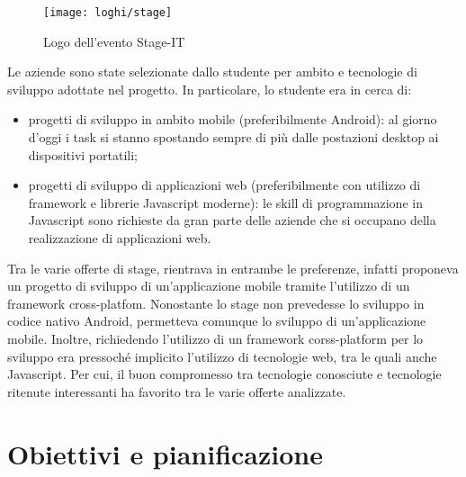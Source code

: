 \begin{figure}[!h] 
    \centering 
    \texttt{[image: loghi/stage]} 
    \caption{Logo dell'evento Stage-IT}
\end{figure}

Le aziende sono state selezionate dallo studente per ambito e tecnologie di sviluppo adottate nel progetto. In particolare, lo studente era in cerca di:
\begin{itemize}
	\item progetti di sviluppo in ambito mobile (preferibilmente Android): al giorno d'oggi i task si stanno spostando sempre di più dalle postazioni desktop ai dispositivi portatili;
	\item progetti di sviluppo di applicazioni web (preferibilmente con utilizzo di framework e librerie Javascript moderne): le skill di programmazione in Javascript sono richieste da gran parte delle aziende che si occupano della realizzazione di applicazioni web.
\end{itemize}
Tra le varie offerte di stage, \visione{} rientrava in entrambe le preferenze, infatti proponeva un progetto di sviluppo di un'applicazione mobile tramite l'utilizzo di un framework cross-platfom. Nonostante lo stage non prevedesse lo sviluppo in codice nativo Android, permetteva comunque lo sviluppo di un'applicazione mobile. Inoltre, richiedendo l'utilizzo di un framework corss-platform per lo sviluppo era pressoché implicito l'utilizzo di tecnologie web, tra le quali anche Javascript. Per cui, il buon compromesso tra tecnologie conosciute e tecnologie ritenute interessanti ha favorito \visione{} tra le varie offerte analizzate.

\newpage

\section{Obiettivi e pianificazione}

